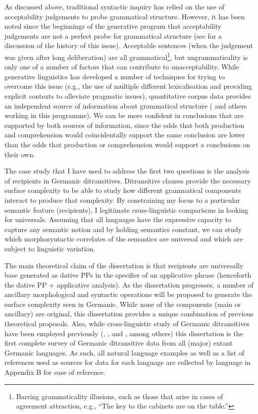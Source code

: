 As discussed above, traditional syntactic inquiry has relied on the use of acceptability judgements to probe grammatical structure. However, it has been noted since the beginnings of the generative program that acceptability judgements are not a perfect probe for grammatical structure (see \citealt{Schutze.1996} for a discussion of the history of this issue). Acceptable sentences (when the judgement was given after long deliberation) are all grammatical\footnote{Barring grammaticality illusions, such as those that arise in cases of agreement attraction, e.g., ``The key to the cabinets are on the table.''}, but ungrammaticality is only one of a number of factors that can contribute to unacceptability. While generative linguistics has developed a number of techniques for trying to overcome this issue (e.g., the use of multiple different lexicalisation and providing explicit contexts to alleviate pragmatic issues), quantitative corpus data provides an independent source of information about grammatical structure (\citealt{Kroch.1989,Kroch.1994} and others working in this programme). We can be more confident in conclusions that are supported by both sources of information, since the odds that both production and comprehension would coincidentally support the same conclusion are lower than the odds that production or comprehension would support a conclusions on their own.

The case study that I have used to address the first two questions is the analysis of recipients in Germanic ditransitives. Ditransitive clauses provide the necessary surface complexity to be able to study how different grammatical components interact to produce that complexity. By constraining my focus to a particular semantic feature (recipients), I legitimate cross-linguistic comparisons in looking for universals. Assuming that all languages have the expressive capacity to capture any semantic notion and by holding semantics constant, we can study which morphosyntactic correlates of the semantics are universal and which are subject to linguistic variation.

The main theoretical claim of the dissertation is that recipients are universally base generated as dative PPs in the specifier of an applicative phrase (henceforth the dative PP + applicative analysis). As the dissertation progresses, a number of ancillary morphological and syntactic operations will be proposed to generate the surface complexity seen in Germanic. While none of the components (main or ancillary) are original, this dissertation provides a unique combination of previous theoretical proposals. Also, while cross-linguistic study of Germanic ditransitives have been employed previously (\citealt{Falk.1990}, \citealt{Sprouse.1995}, and \citealt{Holmberg.1995}, among others) this dissertation is the first complete survey of Germanic ditransitive data from all (major) extant Germanic languages. As such, all natural language examples as well as a list of references used as sources for data for each language are collected by language in Appendix B for ease of reference.

